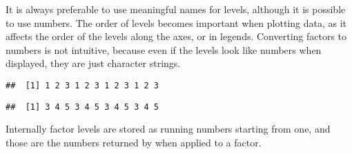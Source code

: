 \documentclass[paper=a4,10pt,div=17,headsepline,BCOR=12mm,twoside,open=right]{scrbook}\usepackage{knitr}
\begin{document}
\begin{knitrout}\footnotesize
{}\color{fgcolor}\begin{kframe}
\begin{alltt}
 \hlkwb{<-} \hlstd{(}\hlstd{,} \hlstd{,} \hlstd{,} \hlstd{,} \hlstd{,} \hlstd{)}
 \hlkwb{<-} 
 \hlkwb{<-}  \hlstd{=}\hlstd{(}\hlstd{,} \hlstd{))}
\end{alltt}
\end{kframe}
\end{knitrout}

It is always preferable to use meaningful names for levels, although it is possible to use numbers. The order of levels becomes important when plotting data, as it affects the order of the levels along the axes, or in legends. Converting factors to numbers is not intuitive, because even if the levels look like numbers when displayed, they are just character strings.

\begin{knitrout}\footnotesize
{}\color{fgcolor}\begin{kframe}
\begin{alltt}
 \hlkwb{<-} \hlstd{(}\hlopt{:}\hlstd{,} \hlstd{)}
 \hlkwb{<-} 
\end{alltt}
\begin{verbatim}
##  [1] 1 2 3 1 2 3 1 2 3 1 2 3
\end{verbatim}
\begin{alltt}
\hlstd{(}
\end{alltt}
\begin{verbatim}
##  [1] 3 4 5 3 4 5 3 4 5 3 4 5
\end{verbatim}
\end{kframe}
\end{knitrout}

Internally factor levels are stored as running numbers starting from one, and those are the numbers returned by  when applied to a factor.
\end{document}
